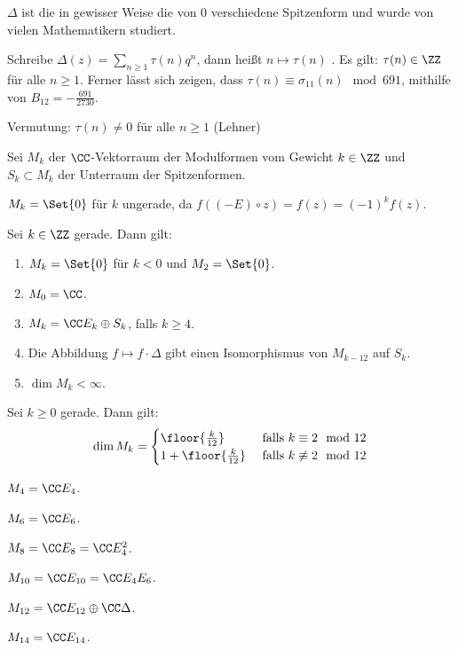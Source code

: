 \begin{beme}
$\Delta$ ist die in gewisser Weise die  von 0 verschiedene Spitzenform und wurde von vielen Mathematikern studiert.

\begin{bsp-list}
\item Schreibe $\Delta(z) = \sum_{n \geq 1} \tau (n) q^n$, dann heißt $n \mapsto \tau (n)$ . Es gilt: $\tau (n) \in \ZZ$ für alle $n \geq 1$. Ferner lässt sich zeigen, dass $\tau (n) \equiv \sigma_{11}(n) \mod 691$, mithilfe von $B_{12} = - \frac{691}{2730}$.
\item Vermutung: $\tau (n) \neq 0$ für alle $n \geq 1$ (Lehner)
\end{bsp-list}

\end{beme}


Sei $M_k$ der $\CC$-Vektorraum der Modulformen vom Gewicht $k \in \ZZ$ und $S_k \subset M_k$ der Unterraum der Spitzenformen.

\begin{beme}
$M_k = \Set {0}$ für $k$ ungerade, da $f((-E) \circ z) = f(z) = (-1)^k f(z)$.
\end{beme}

\begin{satz}\label{M_k1}
Sei $k \in \ZZ$ gerade. Dann gilt:
\begin{enumerate}
	\item $M_k = \Set {0}$ für $k < 0$ und $M_2 = \Set {0}$.
	\item $M_0 = \CC$.
	\item $M_k = \CC E_k \oplus S_k$, falls $k \geq 4$.
	\item Die Abbildung $f \mapsto f \cdot \Delta$ gibt einen Isomorphismus von $M_{k-12}$ auf $S_k$.
	\item $\dim M_k < \infty$.
\end{enumerate}
\end{satz}

\begin{satz}
Sei $k \geq 0$ gerade. Dann gilt:
\[
\dim M_k = \begin{cases}
\floor{\frac k{12}} & \text{ falls } k \equiv 2 \mod 12\\
1 + \floor{\frac k{12}} & \text{ falls } k \not \equiv 2 \mod 12
\end{cases}
\]
\end{satz}

\begin{bsp-list}\label{M_k2}
\item $M_4 = \CC E_4$.
\item $M_6 = \CC E_6$.
\item $M_8 = \CC E_8 = \CC E_4^2$.
\item $M_{10} = \CC E_{10} = \CC E_4 E_6$.
\item $M_{12} = \CC E_{12} \oplus \CC \Delta$.
\item $M_{14} = \CC E_{14}$.
\end{bsp-list}


